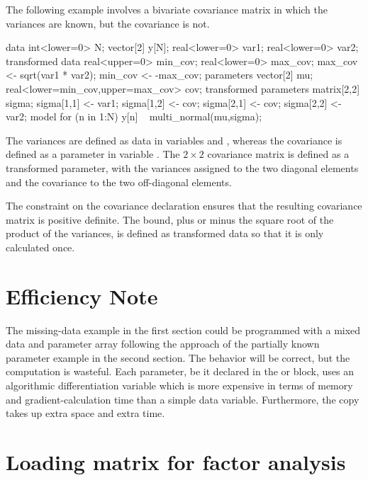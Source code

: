 The following example involves a bivariate covariance matrix in which the
variances are known, but the covariance is not.
%
\begin{stancode}
data {
  int<lower=0> N;
  vector[2] y[N];
  real<lower=0> var1;     real<lower=0> var2;
}
transformed data {
  real<upper=0> min_cov;   
  real<lower=0> max_cov;  
  max_cov <- sqrt(var1 * var2);  
  min_cov <- -max_cov;
}
parameters {
  vector[2] mu;
  real<lower=min_cov,upper=max_cov> cov;
}
transformed parameters {
  matrix[2,2] sigma;
  sigma[1,1] <- var1;     sigma[1,2] <- cov;
  sigma[2,1] <- cov;      sigma[2,2] <- var2;
}  
model {
 for (n in 1:N)
   y[n] ~ multi_normal(mu,sigma);
}
\end{stancode}
%
The variances are defined as data in variables  and
, whereas the covariance is defined as a parameter in
variable .  The $2 \times 2$ covariance matrix
 is defined as a transformed parameter, with the variances
assigned to the two diagonal elements and the covariance to the two
off-diagonal elements.

The constraint on the covariance declaration ensures that the
resulting covariance matrix  is positive definite.  The
bound, plus or minus the square root of the product of the variances,
is defined as transformed data so that it is only calculated once.

\section{Efficiency Note}

The missing-data example in the first section could be programmed with
a mixed data and parameter array following the approach of the
partially known parameter example in the second section.  The behavior
will be correct, but the computation is wasteful.  Each parameter, be
it declared in the  or 
block, uses an algorithmic differentiation variable which is more
expensive in terms of memory and gradient-calculation time than a
simple data variable.  Furthermore, the copy takes up extra space and
extra time.

\section{Loading matrix for factor analysis}

